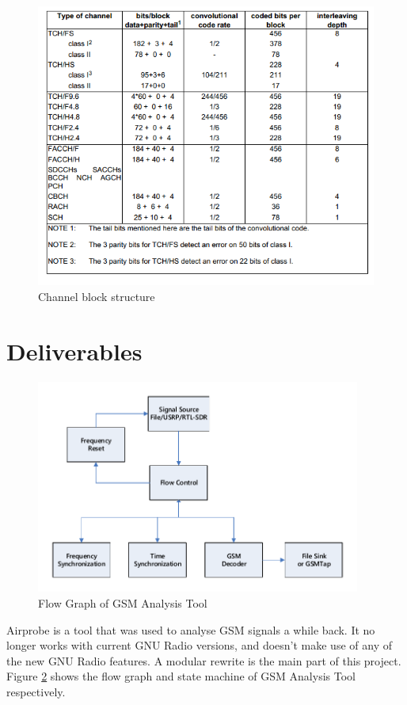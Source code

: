 \documentclass[a4paper,12pt,oneside]{article}
\begin{document}
\begin{figure}[h]
\centering\includegraphics[width=5in]{figure/coding.png}
\caption{Channel block structure \label{fig:coding} \cite{etsi199203}}
\end{figure}


\section{Deliverables}

\begin{figure}[!h]
\centering\includegraphics[width=4.2in]{figure/flowgraph.pdf}
\caption{Flow Graph of GSM Analysis Tool \label{fig:3}}
\end{figure}
Airprobe is a tool that was used to analyse GSM signals a while back. It no longer works with current GNU Radio versions, and doesn't make use of any of the new GNU Radio features. A modular rewrite is the main part of this project.
Figure \ref{fig:3} shows the flow graph and state machine of GSM Analysis Tool respectively.
\end{document}
